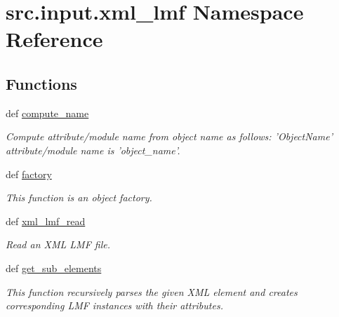 \hypertarget{namespacesrc_1_1input_1_1xml__lmf}{\section{src.\+input.\+xml\+\_\+lmf Namespace Reference}
\label{namespacesrc_1_1input_1_1xml__lmf}
}
\subsection*{Functions}
\begin{DoxyCompactItemize}
\item 
def \hyperlink{namespacesrc_1_1input_1_1xml__lmf_a30fc17ed012d8c1ffca259f4d2f496ec}{compute\+\_\+name}
\begin{DoxyCompactList}\small\item\em Compute attribute/module name from object name as follows\+: 'Object\+Name' attribute/module name is 'object\+\_\+name'. \end{DoxyCompactList}\item 
def \hyperlink{namespacesrc_1_1input_1_1xml__lmf_abf5d0ebfe32a931e8bf0f292cf44658f}{factory}
\begin{DoxyCompactList}\small\item\em This function is an object factory. \end{DoxyCompactList}\item 
def \hyperlink{namespacesrc_1_1input_1_1xml__lmf_aa225ed6de34fb14e2fa7a209eff26592}{xml\+\_\+lmf\+\_\+read}
\begin{DoxyCompactList}\small\item\em Read an X\+M\+L L\+M\+F file. \end{DoxyCompactList}\item 
def \hyperlink{namespacesrc_1_1input_1_1xml__lmf_aa47e441bb03580d934a631cb0af9bd1b}{get\+\_\+sub\+\_\+elements}
\begin{DoxyCompactList}\small\item\em This function recursively parses the given X\+M\+L element and creates corresponding L\+M\+F instances with their attributes. \end{DoxyCompactList}\end{DoxyCompactItemize}


